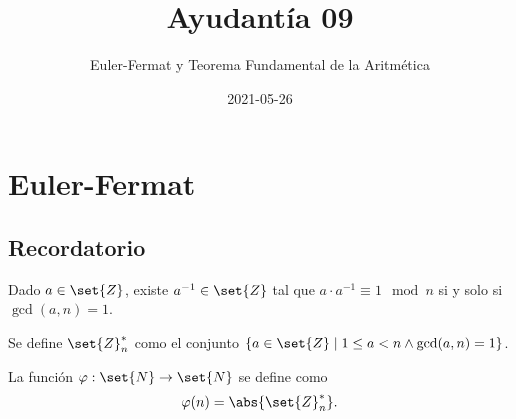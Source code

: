 \documentclass{ayudantia}
\title{Ayudantía 09}
\subtitle{Euler-Fermat y Teorema Fundamental de la Aritmética}
\date{2021-05-26}
\begin{document}
\maketitle
\section{Euler-Fermat}
\subsection{Recordatorio}
\begin{thm}
    Dado \(a\in\set{Z}\), existe \(a^{-1}\in\set{Z}\) tal que \(a\cdot a^{-1}\equiv1\mod n\) si y solo si \(\gcd(a,n)=1\).
\end{thm}
\begin{defn}[\(\set{Z}_n^*\)]
    Se define \(\set{Z}_n^*\) como el conjunto \(\{a\in\set{Z}\mid 1\leq a<n\wedge\gcd(a,n)=1\}\).
\end{defn}
\begin{defn}
    La función \(\varphi:\set{N}\rightarrow\set{N}\) se define como
    \begin{equation*}
        \varphi(n)=\abs{\set{Z}_n^*}.
    \end{equation*}
\end{defn}
\end{document}
